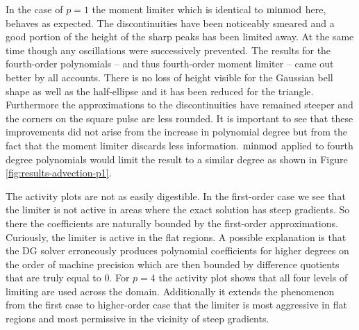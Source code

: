 In the case of $p = 1$ the moment limiter which is identical to $\operatorname{minmod}$ here, behaves as expected.
The discontinuities have been noticeably smeared and a good portion of the height of the sharp peaks has been limited away.
At the same time though any oscillations were successively prevented.
The results for the fourth-order polynomials -- and thus fourth-order moment limiter -- came out better by all accounts.
There is no loss of height visible for the Gaussian bell shape as well as the half-ellipse and it has been reduced for the triangle.
Furthermore the approximations to the discontinuities have remained steeper and the corners on the square pulse are less rounded.
It is important to see that these improvements did not arise from the increase in polynomial degree but from the fact that the moment limiter discards less information.
$\operatorname{minmod}$ applied to fourth degree polynomials would limit the result to a similar degree as shown in Figure \ref{fig:results-advection-p1}.

The activity plots are not as easily digestible.
In the first-order case we see that the limiter is not active in areas where the exact solution has steep gradients.
So there the coefficients are naturally bounded by the first-order approximations.
Curiously, the limiter is active in the flat regions.
A possible explanation is that the DG solver erroneously produces polynomial coefficients for higher degrees on the order of machine precision which are then bounded by difference quotients that are truly equal to $0$.
For $p = 4$ the activity plot shows that all four levels of limiting are used across the domain.
Additionally it extends the phenomenon from the first case to higher-order case that the limiter is most aggressive in flat regions and most permissive in the vicinity of steep gradients.
